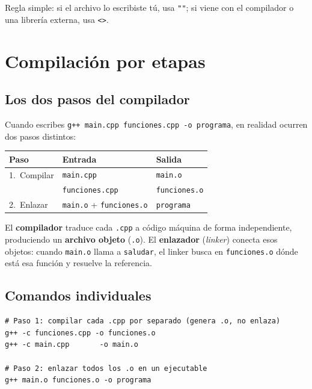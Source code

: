 \documentclass[12pt, oneside]{article}
\begin{document}
Regla simple: si el archivo lo escribiste tú, usa \texttt{""}; si viene
con el compilador o una librería externa, usa \texttt{<>}.

\section{Compilación por etapas}

\subsection{Los dos pasos del compilador}

Cuando escribes \texttt{g++ main.cpp funciones.cpp -o programa}, en
realidad ocurren dos pasos distintos:

\begin{center}
\begin{tabular}{lll}
  \toprule
  \textbf{Paso} & \textbf{Entrada} & \textbf{Salida} \\
  \midrule
  1.\ Compilar  & \texttt{main.cpp}      & \texttt{main.o}      \\
                & \texttt{funciones.cpp} & \texttt{funciones.o} \\
  \midrule
  2.\ Enlazar   & \texttt{main.o} + \texttt{funciones.o} & \texttt{programa} \\
  \bottomrule
\end{tabular}
\end{center}

El \textbf{compilador} traduce cada \texttt{.cpp} a código máquina de
forma independiente, produciendo un \textbf{archivo objeto} (\texttt{.o}).
El \textbf{enlazador} (\textit{linker}) conecta esos objetos: cuando
\texttt{main.o} llama a \texttt{saludar}, el linker busca en
\texttt{funciones.o} dónde está esa función y resuelve la referencia.

\subsection{Comandos individuales}

\begin{verbatim}
# Paso 1: compilar cada .cpp por separado (genera .o, no enlaza)
g++ -c funciones.cpp -o funciones.o
g++ -c main.cpp       -o main.o

# Paso 2: enlazar todos los .o en un ejecutable
g++ main.o funciones.o -o programa
\end{verbatim}
\end{document}
